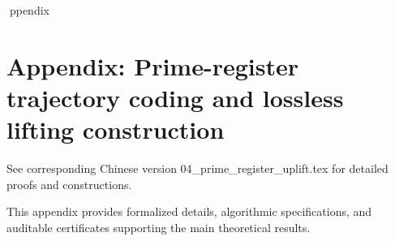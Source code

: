 ppendix

\section*{Appendix: Prime-register trajectory coding and lossless lifting construction}

See corresponding Chinese version 04_prime_register_uplift.tex for detailed proofs and constructions.

This appendix provides formalized details, algorithmic specifications, and auditable certificates supporting the main theoretical results.

